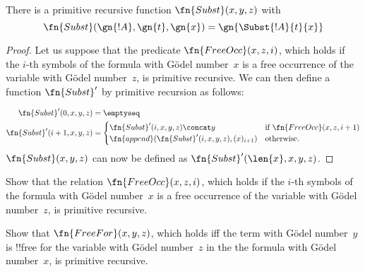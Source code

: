 \documentclass[../../include/open-logic-section]{subfiles}
\begin{document}

\begin{prop}
There is a primitive recursive function $\fn{Subst}(x, y, z)$ with
\[
\fn{Subst}(\gn{!A}, \gn{t}, \gn{x}) = \gn{\Subst{!A}{t}{x}}
\]
\end{prop}

\begin{proof}
Let us suppose that the predicate $\fn{FreeOcc}(x, z, i)$, which holds
if the $i$-th symbols of the formula with G\"odel number~$x$ is a free
occurrence of the variable with G\"odel number~$z$, is primitive
recursive.  We can then define a function $\fn{Subst}'$ by primitive
recursion as follows:

\begin{align*}
\fn{Subst}'(0, x, y, z) & = \emptyseq \\
\fn{Subst}'(i + 1, x, y, z) & =
\begin{cases}
\fn{Subst}'(i, x, y, z) \concat y & \text{if $\fn{FreeOcc}(x, z, i+1)$} \\
\fn{append}(\fn{Subst}'(i, x, y, z), (x)_{i+1}) & \text{otherwise.}
\end{cases}
\end{align*}
$\fn{Subst}(x, y, z)$ can now be defined as $\fn{Subst}'(\len{x}, x, y, z)$.
\end{proof}

\begin{prob}
Show that the relation $\fn{FreeOcc}(x, z, i)$, which holds if the
$i$-th symbols of the formula with G\"odel number~$x$ is a free
occurrence of the variable with G\"odel number~$z$, is primitive
recursive.
\end{prob}

\begin{prob}
Show that $\fn{FreeFor}(x, y, z)$, which holds iff the term with
G\"odel number~$y$ is !!{free for} the variable with G\"odel
number~$z$ in the the formula with G\"odel number~$x$, is primitive
recursive.
\end{prob}
\end{document}
